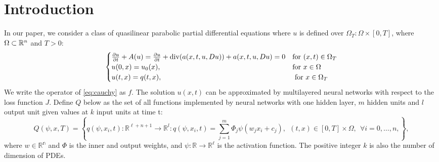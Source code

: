 \documentclass{article}
\begin{document}
	\tableofcontents
	\section{Introduction}

	In our paper, we consider a class of quasilinear parabolic partial differential equations where $u$ is defined over $\Omega_T:\Omega\times [0,T]$, where $\Omega\subset\Bbb R^n$ and $T>0$:
	\begin{equation}
	\begin{cases}
 \frac{\partial u}{\partial t} +A(u) =\frac{\partial u}{\partial t}+{\rm div}(a(x,t,u,Du))+a(x,t,u,Du)=0 & \text{for $(x,t) \in \Omega_{T}$}\\
u(0,x) = u_{0}(x), & \text{for $x \in \Omega$} \\
u(t,x) = q(t,x), & \text{ for $x \in \Omega_{T}$} \\
	\end{cases}
	\label{eq:cauchy}
	\end{equation}
	We write the operator of \ref{eq:cauchy} as $f$. The solution $u(x,t)$ can be approximated by multilayered neural networks with respect to the loss function $J$.
Define $Q$ below as the set of all functions implemented by neural networks with one hidden layer, $m$ hidden units and $\textit{l}$ output unit given values at $k$ input units at time t:
	\begin{equation}
	Q(\psi,x,T)=\left \lbrace q(\psi,x_i,t): \mathbb{R}^{\ell+n+1} \rightarrow \mathbb{R}^{\textit{l}}:
q(\psi,x_i,t) = \sum_{j=1}^{m}\Phi_{j}\psi(w_{j}x_{i} + c_j ),\  \ (t,x) \in [0,T]\times \Omega, \ \ \forall i = 0, \dots, n ,  \right\rbrace,
	\label{eq:nn}
	\end{equation}
	where $w\in\mathbb{R^n}$ and $\Phi$ is the inner and output weights,
and $\psi:\mathbb{R}\to\mathbb{R^\ell}$ is the activation function.
The positive integer $k$ is also the number of dimension of PDEs.
\end{document}
